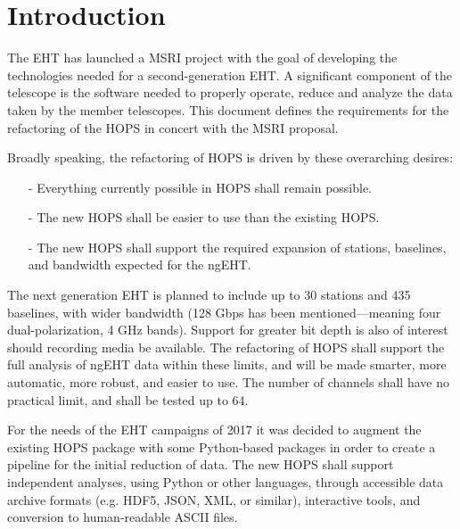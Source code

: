 %
%

\section{Introduction}
\label{sec:intro}

The \ac{EHT} has launched a \ac{MSRI} project with the goal of developing
the technologies needed for a second-generation \acs{EHT}. 
A significant component of the telescope is the software needed to 
properly operate, reduce and analyze the data taken by the member telescopes.
This document defines the requirements for the refactoring of the \ac{HOPS} in 
concert with the \acs{MSRI} proposal. 

Broadly speaking, the refactoring of \acs{HOPS} is driven by
these overarching desires:

\begin{itemize}
\item[-] Everything currently possible in \ac{HOPS} shall remain possible.

\item[-] The new HOPS shall be easier to use than the existing \acs{HOPS}.
 
\item[-] The new \acs{HOPS} shall support the required expansion of stations, 
baselines, and bandwidth expected for the ngEHT.

\end{itemize}

The next generation \acs{EHT} is planned to include up to 30 stations
and 435 baselines, with wider bandwidth (128 Gbps has been mentioned---meaning
four dual-polarization, 4 GHz bands). Support for greater bit depth is
also of interest should recording media be available.  The refactoring
of \ac{HOPS} shall support the full analysis of ngEHT data within these limits,
and will be made smarter, more automatic, more robust, and easier to use. The
number of channels shall have no practical limit, and shall be tested up to 64.


For the needs of the \acs{EHT} campaigns of 2017 it was decided to augment
the existing HOPS package with some Python-based packages in order to
create a pipeline for the initial reduction of data. The new \ac{HOPS} shall
support independent analyses, using Python or other languages, through
accessible data archive formats (e.g. HDF5, JSON, XML, or similar), interactive 
tools, and conversion to human-readable ASCII files. 

